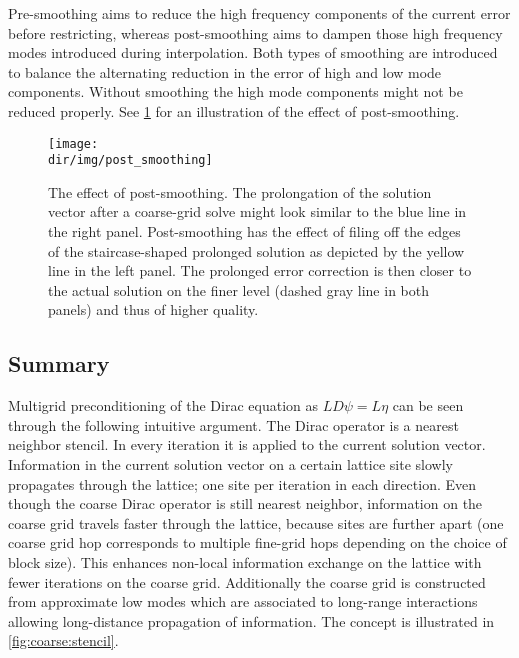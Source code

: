 Pre-smoothing aims to reduce the high frequency components of the current error before restricting, whereas post-smoothing aims to dampen those high frequency modes introduced during interpolation.
Both types of smoothing are introduced to balance the alternating reduction in the error of high and low mode components.
Without smoothing the high mode components might not be reduced properly.
See \cref{fig:post:smoothing} for an illustration of the effect of post-smoothing.
\begin{figure}
    \centering
    \texttt{[image: \\dir/img/post\_smoothing]}
    \caption{The effect of post-smoothing. The prolongation of the solution vector after a coarse-grid solve might look similar to the blue line in the right panel. Post-smoothing has the effect of filing off the edges of the staircase-shaped prolonged solution as depicted by the yellow line in the left panel. The prolonged error correction is then closer to the actual solution on the finer level (dashed gray line in both panels) and thus of higher quality.}
    \label{fig:post:smoothing}
\end{figure}

\subsection{Summary}


Multigrid preconditioning of the Dirac equation as $L D \psi = L \eta$ can be seen through the following intuitive argument.
The Dirac operator is a nearest neighbor stencil.
In every iteration it is applied to the current solution vector.
Information in the current solution vector on a certain lattice site slowly propagates through the lattice; one site per iteration in each direction.
Even though the coarse Dirac operator is still nearest neighbor, information on the coarse grid travels faster through the lattice, because sites are further apart (\ie one coarse grid hop corresponds to multiple fine-grid hops depending on the choice of block size).
This enhances non-local information exchange on the lattice with fewer iterations on the coarse grid.
Additionally the coarse grid is constructed from approximate low modes which are associated to long-range interactions allowing long-distance propagation of information.
The concept is illustrated in \cref{fig:coarse:stencil}.

